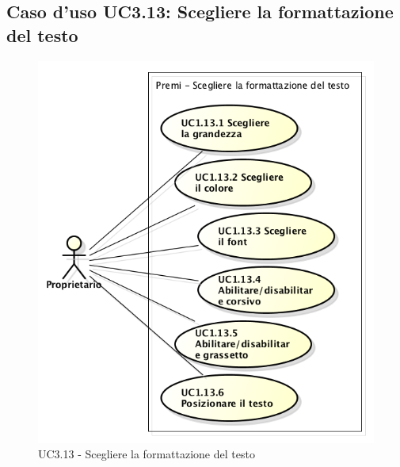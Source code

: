 \subsection{Caso d'uso UC3.13: Scegliere la formattazione del testo}
\begin{figure}[h] 
	\centering 
	\includegraphics[scale=0.45] {img/UC3.13.png} 
	\caption{UC3.13 - Scegliere la formattazione del testo}
\end{figure}

